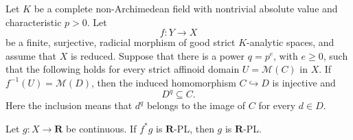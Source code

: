 
\begin{proposition}
\label{prop:p061-frobenius-rpl-descent}
Let \(K\) be a complete non-Archimedean field with nontrivial absolute
value and characteristic \(p>0\).  Let
\[
                         f:Y\longrightarrow X
\]
be a finite, surjective, radicial morphism of good strict \(K\)-analytic
spaces, and assume that \(X\) is reduced.  Suppose that there is a power
\(q=p^e\), with \(e\geq 0\), such that the following holds for every strict
affinoid domain \(U=\mathcal M(C)\) in \(X\).  If
\(f^{-1}(U)=\mathcal M(D)\), then the induced homomorphism
\(C\hookrightarrow D\) is injective and
\[
                              D^q\subseteq C.
\]
Here the inclusion means that \(d^q\) belongs to the image of \(C\) for
every \(d\in D\).

Let \(g:X\to\mathbf R\) be continuous.  If \(f^*g\) is
\(\mathbf R\)-PL, then \(g\) is \(\mathbf R\)-PL.
\end{proposition}
